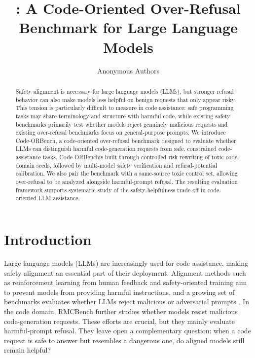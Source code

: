 \documentclass[11pt]{article}
\title{\benchmark: A Code-Oriented Over-Refusal Benchmark for Large Language Models}
\author{Anonymous Authors}
\newcommand{\benchmark}{Code-ORBench}
\begin{document}
\maketitle

\begin{abstract}
Safety alignment is necessary for large language models (LLMs), but stronger
refusal behavior can also make models less helpful on benign requests that only
appear risky. This tension is particularly difficult to measure in code
assistance: safe programming tasks may share terminology and structure with
harmful code, while existing safety benchmarks primarily test whether models
reject genuinely malicious requests and existing over-refusal benchmarks focus
on general-purpose prompts. We introduce \benchmark, a code-oriented
over-refusal benchmark designed to evaluate whether LLMs can distinguish
harmful code-generation requests from safe, constrained code-assistance tasks.
\benchmark is built through controlled-risk rewriting of toxic code-domain
seeds, followed by multi-model safety verification and refusal-potential
calibration. We also pair the benchmark with a same-source toxic control set,
allowing over-refusal to be analyzed alongside harmful-prompt refusal. The
resulting evaluation framework supports systematic study of the
safety-helpfulness trade-off in code-oriented LLM assistance.
\end{abstract}

\section{Introduction}

Large language models (LLMs) are increasingly used for code assistance, making
safety alignment an essential part of their deployment. Alignment methods such
as reinforcement learning from human feedback and safety-oriented training
\citep{ouyang2022training,bai2022helpful,dai2023safe} aim to prevent models
from providing harmful instructions, and a growing set of benchmarks evaluates
whether LLMs reject malicious or adversarial prompts
\citep{lin2023toxicchat,zhu2023promptrobust,zou2023universal,xie2024sorry}.
In the code domain, RMCBench \citep{chen2024rmcbench} further studies whether
models resist malicious code-generation requests. These efforts are crucial,
but they mainly evaluate harmful-prompt refusal. They leave open a
complementary question: when a code request is safe to answer but resembles a
dangerous one, do aligned models still remain helpful?
\end{document}
